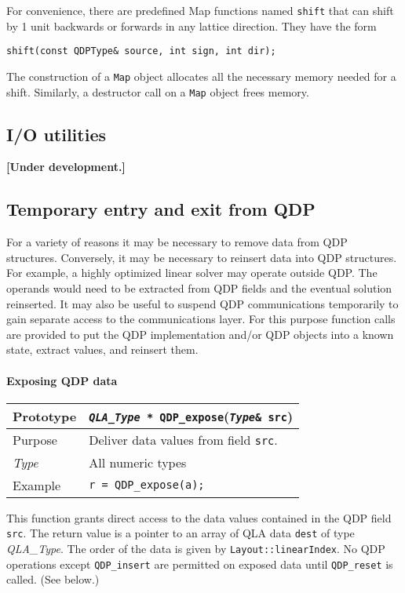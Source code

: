 \documentclass[12pt,letterpaper]{article}
\newcommand{\allNumericTypes}{All numeric types}
\newcommand{\itt}{\it Type}
\begin{document}
For convenience, there are predefined Map functions named \verb|shift|
that can shift by 1 unit backwards or forwards in any lattice direction.
They have the form
%
\begin{verbatim}
shift(const QDPType& source, int sign, int dir);
\end{verbatim}

The construction of a \verb|Map| object allocates all the necessary
memory needed for a shift. Similarly, a destructor call on a \verb|Map|
object frees memory.

\subsection{I/O utilities}

{\bf [Under development.]}

\subsection{Temporary entry and exit from QDP}

For a variety of reasons it may be necessary to remove data from QDP
structures.  Conversely, it may be necessary to reinsert data into QDP
structures.  For example, a highly optimized linear solver may
operate outside QDP.  The operands would need to be extracted from QDP
fields and the eventual solution reinserted.  It may also be useful to
suspend QDP communications temporarily to gain separate access to the
communications layer.  For this purpose function calls are provided to
put the QDP implementation and/or QDP objects into a known state,
extract values, and reinsert them.

\paragraph{Exposing QDP data}

\begin{flushleft}
\begin{tabular}{|l|l|}
\hline
Prototype    & {\tt {\it QLA\_Type *} QDP\_expose}({\tt {\it Type}\& src})\\
\hline
Purpose        & Deliver data values from field {\tt src}. \\
\hline
\itt     & \allNumericTypes \\
\hline
Example  & \verb|r = QDP_expose(a);| \\
\hline
\end{tabular}
\end{flushleft}
%
This function grants direct access to the data values contained in the
QDP field {\tt src}.  The return value is a pointer to an array of QLA
data {\tt dest} of type {\it QLA\_Type}.  The order of the data is given by
\verb|Layout::linearIndex|.  No QDP operations except \verb|QDP_insert| are
permitted on exposed data until \verb|QDP_reset| is called. (See
below.)
\end{document}
